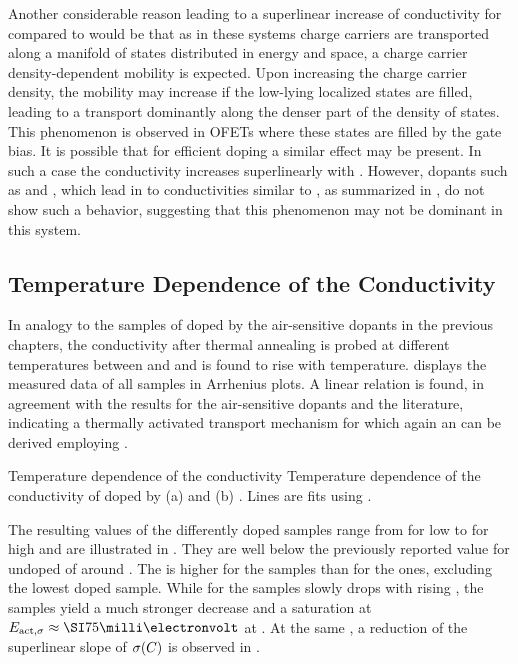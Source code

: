 Another considerable reason leading to a superlinear increase of conductivity for \dmbi compared to \aob would be that as in these systems charge carriers are transported along a manifold of states distributed in energy and space, a charge carrier density-dependent mobility is expected. Upon increasing the charge carrier density, the mobility may increase if the low-lying localized states are filled, leading to a transport dominantly along the denser part of the density of states. This phenomenon is observed in OFETs where these states are filled by the gate bias. It is possible that for efficient doping a similar effect may be present. In such a case the conductivity increases superlinearly with \C. However, dopants such as \CrPd and \WPd, which lead in \CS to conductivities similar to \dmbi, as summarized in , do not show such a behavior, suggesting that this phenomenon may not be dominant in this system.

\subsection{Temperature Dependence of the Conductivity}
In analogy to the samples of \CS doped by the air-sensitive dopants in the previous chapters, the conductivity after thermal annealing is probed at different temperatures between \T[25] and  and is found to rise with temperature.  displays the measured data of all samples in Arrhenius plots. A linear relation is found, in agreement with the results for the air-sensitive dopants and the literature, indicating a thermally activated transport mechanism for which again an \EactLongL can be derived employing .

{Temperature dependence of the conductivity}%
{Temperature dependence of the conductivity of \CS doped by (a) \aob and (b) \dmbi. Lines are fits using .}

The resulting values of the differently doped samples range from \Eact[63] for low to  for high \CLongs and are illustrated in . They are well below the previously reported value for undoped \CS of around \cite{Li2006}.
The \Eact is higher for the \aob samples than for the \dmbi ones, excluding the lowest doped \dmbi sample.
While for the \aob samples \Eact slowly drops with rising \CLong, the \dmbi samples yield a much stronger decrease and a saturation at \mbox{$\Eact\approx\meV{75}$} at . At the same \CLong, a reduction of the superlinear slope of $\c(\C)$ is observed in .


